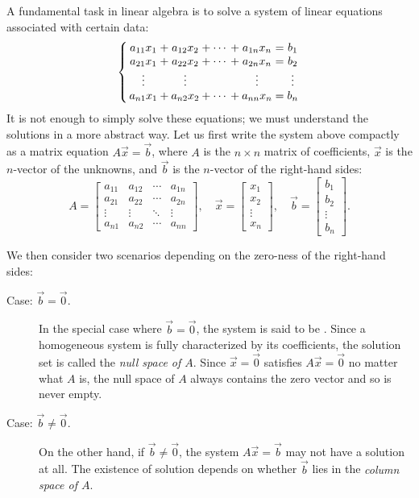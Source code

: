 \documentclass{ximera}
\begin{document}
A fundamental task in linear algebra is to solve a system of linear
equations associated with certain data:
\begin{equation*}
  \left\{ \,
    \begin{array}{*{9}{@{}c@{}}}
      a_{11} x_1 & {}+{} & a_{12} x_2 & {}+{} & \cdots & {}+{} & a_{1n} x_n & {}\mathrel{=}{} & b_1 \\
      a_{21} x_1 & {}+{} & a_{22} x_2 & {}+{} & \cdots & {}+{} & a_{2n} x_n & {}\mathrel{=}{} & b_2 \\
      \vdots         &       & \vdots         &      &   &       & \vdots         &                 & \vdots \\
      a_{n1} x_1 & {}+{} & a_{n2} x_2 & {}+{} & \cdots & {}+{} & a_{nn} x_n & {}\mathrel{=}{} & b_n
    \end{array}
    \, \right.
\end{equation*}
It is not enough to simply solve these equations; we must understand
the solutions in a more abstract way. Let us first write the system
above compactly as a matrix equation $A \vec{x} = \vec{b}$, where $A$
is the $n \times n$ matrix of coefficients, $\vec{x}$ is the
$n$-vector of the unknowns, and $\vec{b}$ is the $n$-vector of the
right-hand sides:
\[
  A =
  \begin{bmatrix}
    a_{11} & a_{12} & \cdots & a_{1n} \\
    a_{21} & a_{22} & \cdots & a_{2n} \\
    \vdots & \vdots & \ddots & \vdots \\
    a_{n1} & a_{n2} & \cdots & a_{nn}
  \end{bmatrix}, \quad
  \vec{x} =
  \begin{bmatrix}
    x_1 \\ x_2 \\ \vdots \\ x_n
  \end{bmatrix}, \quad
  \vec{b} =
  \begin{bmatrix}
    b_1 \\ b_2 \\ \vdots \\ b_n
  \end{bmatrix}.
\]

We then consider two scenarios depending on the zero-ness of the
right-hand sides:
\begin{description}
\item[Case: $\vec{b} = \vec{0}$.] In the special case where
  $\vec{b} = \vec{0}$, the system is said to be
  . Since a homogeneous system is fully characterized
  by its coefficients, the solution set is called the \textit{null
    space of $A$}. Since $\vec{x} = \vec{0}$ satisfies
  $A\vec{x} = \vec{0}$ no matter what $A$ is, the null space of $A$
  always contains the zero vector and so is never empty.
\item[Case: $\vec{b} \neq \vec{0}$.] On the other hand, if
  $\vec{b} \neq \vec{0}$, the system $A\vec{x} = \vec{b}$ may not have a
  solution at all. The existence of solution depends on whether
  $\vec{b}$ lies in the \textit{column space of $A$}.
\end{description}
\end{document}
